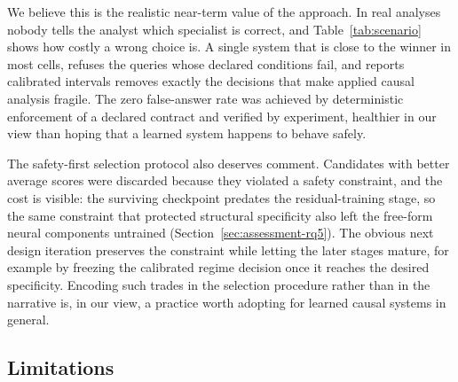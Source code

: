 \documentclass[electronics,article,submit,oneauthor]{Definitions/mdpi}
\begin{document}
We believe this is the realistic near-term value of the approach. In real analyses nobody tells the analyst which specialist is correct, and Table~\ref{tab:scenario} shows how costly a wrong choice is. A single system that is close to the winner in most cells, refuses the queries whose declared conditions fail, and reports calibrated intervals removes exactly the decisions that make applied causal analysis fragile. The zero false-answer rate was achieved by deterministic enforcement of a declared contract and verified by experiment, healthier in our view than hoping that a learned system happens to behave safely.

The safety-first selection protocol also deserves comment. Candidates with better average scores were discarded because they violated a safety constraint, and the cost is visible: the surviving checkpoint predates the residual-training stage, so the same constraint that protected structural specificity also left the free-form neural components untrained (Section~\ref{sec:assessment-rq5}). The obvious next design iteration preserves the constraint while letting the later stages mature, for example by freezing the calibrated regime decision once it reaches the desired specificity. Encoding such trades in the selection procedure rather than in the narrative is, in our view, a practice worth adopting for learned causal systems in general.

\subsection{Limitations}\label{sec:discussion-limitations}
\end{document}

